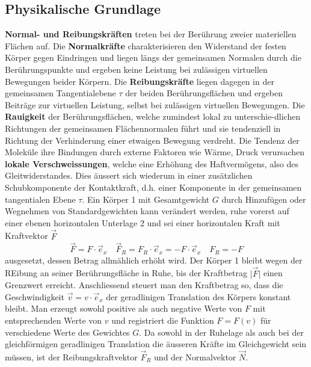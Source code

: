\subsection{Physikalische Grundlage}
\textbf{Normal- und Reibungskräften} treten bei der Berührung zweier materiellen Flächen auf. Die \textbf{Normalkräfte} charakterisieren den Widerstand der festen Körper gegen Eindringen und liegen längs der gemeinsamen Normalen durch die Berührungspunkte und ergeben keine Leistung bei zulässigen virtuellen Bewegungen beider Körpern. Die \textbf{Reibungskräfte} liegen dagegen in der gemeinsamen Tangentialebene $\tau$ der beiden Berührungsflächen und ergeben Beiträge zur virtuellen Leistung, selbst bei zulässigen virtuellen Bewegungen.
\newline\newline
Die \textbf{Rauigkeit} der Berührungsflächen, welche zumindest lokal zu unterschie-dlichen Richtungen der gemeinsamen Flächennormalen führt und sie tendenziell in Richtung der Verhinderung einer etwaigen Bewegung verdreht. Die Tendenz der Moleküle ihre Bindungen durch externe Faktoren wie Wärme, Druck verursachen \textbf{lokale Verschweissungen}, welche eine Erhöhung des Haftvermögens, also des Gleitwiderstandes. Dies äussert sich wiederum in einer zusätzlichen Schubkomponente der Kontaktkraft, d.h. einer Komponente in der gemeinsamen tangentialen Ebene $\tau$.
\newline\newline
Ein Körper 1 mit Gesamtgewicht $G$ durch Hinzufügen oder Wegnehmen von Standardgewichten kann verändert werden, ruhe vorerst auf einer ebenen horizontalen Unterlage 2 und sei einer horizontalen Kraft mit Kraftvektor $\overrightarrow{F}$
\begin{equation}
\boxed{\overrightarrow{F}=F\cdot \overrightarrow{e}_x}\quad \boxed{\overrightarrow{F}_R=F_R\cdot \overrightarrow{e}_x=-F\cdot \overrightarrow{e}_x}\quad \boxed{F_R=-F}
\end{equation}
ausgesetzt, dessen Betrag allmählich erhöht wird. Der Körper 1 bleibt wegen der REibung an seiner Berührungsfläche in Ruhe, bis der Kraftbetrag $\Big\vert \overrightarrow{F}\Big\vert$ einen Grenzwert erreicht. Anschliessend steuert man den Kraftbetrag so, dass die Geschwindigkeit $\overrightarrow{v}=v\cdot \overrightarrow{e}_x$ der geradlinigen Translation des Körpers konstant bleibt. Man erzeugt sowohl positive als auch negative Werte von $F$ mit entsprechenden Werte von $v$ und registriert die Funktion $F=F\left(v\right)$ für verschiedene Werte des Gewichtes $G$. Da sowohl in der Ruhelage als auch bei der gleichförmigen geradlinigen Translation die äusseren Kräfte im Gleichgewicht sein müssen, ist der Reibungskraftvektor $\overrightarrow{F}_R$ und der Normalvektor $\overrightarrow{N}$.
